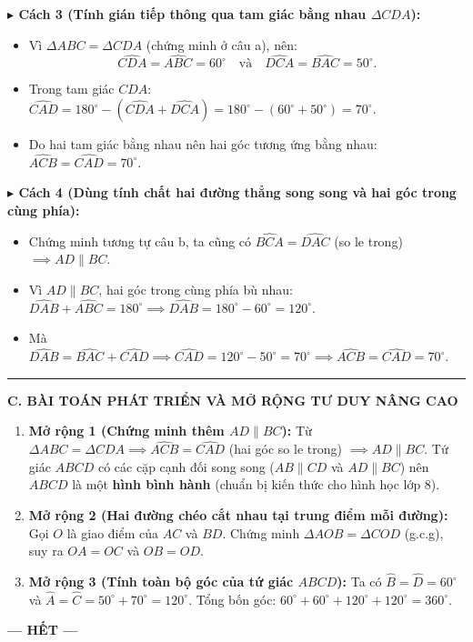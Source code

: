 \documentclass[12pt,a4paper]{article}
\begin{document}
\vspace{1.5mm}
\noindent\textbf{$\blacktriangleright$ Cách 3 (Tính gián tiếp thông qua tam giác bằng nhau $\Delta CDA$):}
\begin{itemize}[leftmargin=16pt, itemsep=2pt, parsep=0pt]
  \item Vì $\Delta ABC = \Delta CDA$ (chứng minh ở câu a), nên:
  \[
    \widehat{CDA} = \widehat{ABC} = 60^\circ \quad \text{và} \quad \widehat{DCA} = \widehat{BAC} = 50^\circ.
  \]
  \item Trong tam giác $CDA$: $\widehat{CAD} = 180^\circ - (\widehat{CDA} + \widehat{DCA}) = 180^\circ - (60^\circ + 50^\circ) = 70^\circ$.
  \item Do hai tam giác bằng nhau nên hai góc tương ứng bằng nhau: $\widehat{ACB} = \widehat{CAD} = 70^\circ$.
\end{itemize}

\vspace{1.5mm}
\noindent\textbf{$\blacktriangleright$ Cách 4 (Dùng tính chất hai đường thẳng song song và hai góc trong cùng phía):}
\begin{itemize}[leftmargin=16pt, itemsep=2pt, parsep=0pt]
  \item Chứng minh tương tự câu b, ta cũng có $\widehat{BCA} = \widehat{DAC}$ (so le trong) $\implies AD \parallel BC$.
  \item Vì $AD \parallel BC$, hai góc trong cùng phía bù nhau:
  $\widehat{DAB} + \widehat{ABC} = 180^\circ \implies \widehat{DAB} = 180^\circ - 60^\circ = 120^\circ$.
  \item Mà $\widehat{DAB} = \widehat{BAC} + \widehat{CAD} \implies \widehat{CAD} = 120^\circ - 50^\circ = 70^\circ \implies \widehat{ACB} = \widehat{CAD} = 70^\circ$.
\end{itemize}

\vspace{2mm}
\hrule
\vspace{2mm}

\noindent\textbf{\large C. BÀI TOÁN PHÁT TRIỂN VÀ MỞ RỘNG TƯ DUY NÂNG CAO}

\begin{enumerate}[label=\textbf{\arabic*.)}, leftmargin=*, itemsep=2pt, parsep=0pt]
  \item \textbf{Mở rộng 1 (Chứng minh thêm $AD \parallel BC$):}
  Từ $\Delta ABC = \Delta CDA \implies \widehat{ACB} = \widehat{CAD}$ (hai góc so le trong) $\implies AD \parallel BC$.
  Tứ giác $ABCD$ có các cặp cạnh đối song song ($AB \parallel CD$ và $AD \parallel BC$) nên $ABCD$ là một \textbf{hình bình hành} (chuẩn bị kiến thức cho hình học lớp 8).
  
  \item \textbf{Mở rộng 2 (Hai đường chéo cắt nhau tại trung điểm mỗi đường):}
  Gọi $O$ là giao điểm của $AC$ và $BD$.
  Chứng minh $\Delta AOB = \Delta COD$ (g.c.g), suy ra $OA = OC$ và $OB = OD$.
  
  \item \textbf{Mở rộng 3 (Tính toàn bộ góc của tứ giác $ABCD$):}
  Ta có $\widehat{B} = \widehat{D} = 60^\circ$ và $\widehat{A} = \widehat{C} = 50^\circ + 70^\circ = 120^\circ$.
  Tổng bốn góc: $60^\circ + 60^\circ + 120^\circ + 120^\circ = 360^\circ$.
\end{enumerate}

\vfill
\begin{center}
  \textbf{--- HẾT ---}
\end{center}
\end{document}
